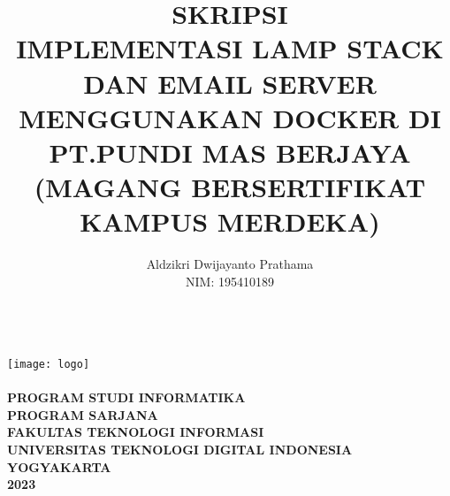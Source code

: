 \documentclass[../SKRIPSI_ALDZIKRI_DWIJAYANTO_PRATHAMA.tex]{subfiles}
\begin{document}
\title{{\Large SKRIPSI\\
  \Large{IMPLEMENTASI LAMP STACK DAN EMAIL SERVER
  MENGGUNAKAN DOCKER DI PT.PUNDI MAS BERJAYA\\[1ex]}}
  \large{(MAGANG BERSERTIFIKAT KAMPUS MERDEKA)}}
\author{Aldzikri Dwijayanto Prathama
    \\NIM: 195410189}
\makeatletter
\begin{titlepage}
    \begin{center}
        {\huge \bfseries \@title}\\[14ex]
        \texttt{[image: logo]}\\[4ex]
        {\large \bfseries  \@author}\\[12ex]
        {\large \bfseries {PROGRAM STUDI INFORMATIKA\\
        PROGRAM SARJANA\\
        FAKULTAS TEKNOLOGI INFORMASI\\
        UNIVERSITAS TEKNOLOGI DIGITAL INDONESIA\\
        YOGYAKARTA\\
        2023}}
    \end{center}
\end{titlepage}
\makeatother
\end{document}
